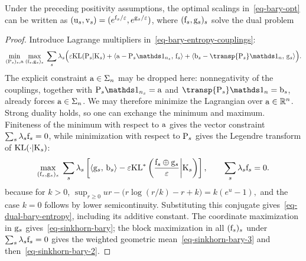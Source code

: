 \begin{prop}\label{prop-dual-entropic-barycenters}
Under the preceding positivity assumptions, the optimal scalings in~\eqref{eq-bary-opt} can be written as $(\uD_s,\vD_s)=(e^{\fD_s/\epsilon},e^{\gD_s/\epsilon})$, where $(\fD_s,\gD_s)_s$ solve the dual problem
\end{prop}
\begin{proof}
Introduce Lagrange multipliers in~\eqref{eq-bary-entropy-couplings}:
\begin{align*}
\umin{(\P_s)_s,\a}
\umax{(\fD_s,\gD_s)_s}
\sum_s\la_s\Big(
\epsilon\KLD(\P_s|\K_s)
+\dotp{\a-\P_s\ones_{n_s}}{\fD_s}
+\dotp{\b_s-\transp{\P_s}\ones_n}{\gD_s}
\Big).
\end{align*}
The explicit constraint $\a\in\simplex_n$ may be dropped here: nonnegativity of the couplings, together with $\P_s\ones_{n_s}=\a$ and $\transp{\P_s}\ones_n=\b_s$, already forces $\a\in\simplex_n$. We may therefore minimize the Lagrangian over $\a\in\RR^n$. Strong duality holds, so one can exchange the minimum and maximum. Finiteness of the minimum with respect to $\a$ gives the vector constraint $\sum_s\la_s\fD_s=0$, while minimization with respect to $\P_s$ gives the Legendre transform of $\KLD(\cdot|\K_s)$:
\[
\umax{(\fD_s,\gD_s)_s}
\sum_s\la_s
\left[
\dotp{\gD_s}{\b_s}
-\epsilon
\KLD^*\left(\frac{\fD_s\oplus\gD_s}{\epsilon}\middle|\K_s\right)
\right],
\qquad
\sum_s\la_s\fD_s=0.
\]
because for $k>0$, \(\sup_{r\geq0} ur-\big(r\log(r/k)-r+k\big) = k(e^u-1),\)
and the case $k=0$ follows by lower semicontinuity. Substituting this conjugate gives~\eqref{eq-dual-bary-entropy}, including its additive constant. The coordinate maximization in $\gD_s$ gives~\eqref{eq-sinkhorn-bary}; the block maximization in all $(\fD_s)_s$ under $\sum_s\lambda_s\fD_s=0$ gives the weighted geometric mean~\eqref{eq-sinkhorn-bary-3} and then~\eqref{eq-sinkhorn-bary-2}.
\end{proof}
